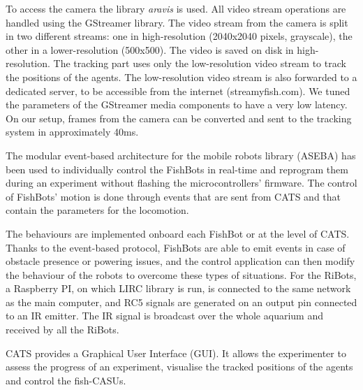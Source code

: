 \documentclass{styles/assisi}
\begin{document}
To access the camera the library {\it aravis} is used. All video stream operations are handled using the GStreamer library. The video stream from the camera is split in two different streams: one in high-resolution (2040x2040 pixels, grayscale), the other in a lower-resolution (500x500). The video is saved on disk in high-resolution. The tracking part uses only the low-resolution video stream to track the positions of the agents. The low-resolution video stream is also forwarded to a dedicated server, to be accessible from the internet (streamyfish.com). We tuned the parameters of the GStreamer media components to have a very low latency. On our setup, frames from the camera can be converted and sent to the tracking system in approximately 40ms.

The modular event-based architecture for the mobile robots library (ASEBA) has been used to individually control the FishBots in real-time and reprogram them during an experiment
without flashing the microcontrollers' firmware. The control of FishBots' motion is done through events that are sent from CATS and that contain the parameters for the locomotion.

The behaviours are implemented onboard each FishBot or at the level of CATS. Thanks to the event-based protocol, FishBots are able to emit events in case of obstacle presence or powering issues, and the control application can then modify the behaviour of the robots to overcome these types of situations. For the RiBots, a Raspberry PI, on which LIRC library is run, is connected to the same network as the main computer, and RC5 signals are generated on an output pin connected to an IR emitter. The IR signal is broadcast over the whole aquarium and received by all the RiBots.

CATS provides a Graphical User Interface (GUI). It allows the experimenter to assess the progress of an experiment, visualise the tracked positions of the agents and control the fish-CASUs.
\end{document}
